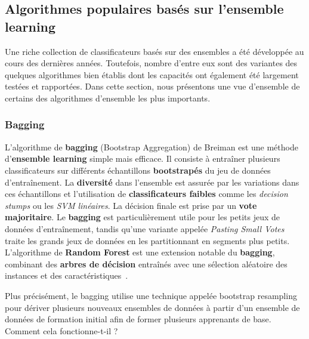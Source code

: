 \subsection{Algorithmes populaires basés sur l'ensemble learning}
Une riche collection de classificateurs basés sur des ensembles a été développée au cours des dernières années. Toutefois, nombre d'entre eux sont des variantes des quelques algorithmes bien établis dont les capacités ont également été largement testées et rapportées. Dans cette section, nous présentons une vue d'ensemble de certains des algorithmes d'ensemble les plus importants.
\subsubsection{Bagging}
L'algorithme de \textbf{bagging} (Bootstrap Aggregation) de Breiman est une méthode d'\textbf{ensemble learning} simple mais efficace. Il consiste à entraîner plusieurs classificateurs sur différents échantillons \textbf{bootstrapés} du jeu de données d'entraînement. La \textbf{diversité} dans l'ensemble est assurée par les variations dans ces échantillons et l'utilisation de \textbf{classificateurs faibles} comme les \textit{decision stumps} ou les \textit{SVM linéaires}. La décision finale est prise par un \textbf{vote majoritaire}. Le \textbf{bagging} est particulièrement utile pour les petits jeux de données d'entraînement, tandis qu'une variante appelée \textit{Pasting Small Votes} traite les grands jeux de données en les partitionnant en segments plus petits. L'algorithme de \textbf{Random Forest} est une extension notable du \textbf{bagging}, combinant des \textbf{arbres de décision} entraînés avec une sélection aléatoire des instances et des caractéristiques~\cite{polikar2012ensemble}.

Plus précisément, le bagging utilise une technique appelée bootstrap resampling pour dériver plusieurs nouveaux ensembles de données à partir d'un ensemble de données de formation initial afin de former plusieurs apprenants de base. Comment cela fonctionne-t-il ?\newpage
